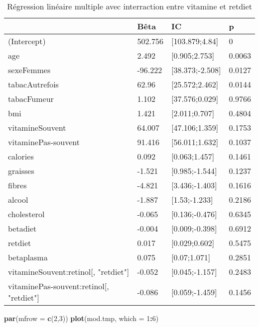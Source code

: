 \documentclass[]{article}
\newenvironment{Shaded}{\begin{snugshade}}{\end{snugshade}}
\newcommand{\KeywordTok}[1]{\textcolor[rgb]{0.13,0.29,0.53}{\textbf{#1}}}
\newcommand{\DataTypeTok}[1]{\textcolor[rgb]{0.13,0.29,0.53}{#1}}
\newcommand{\DecValTok}[1]{\textcolor[rgb]{0.00,0.00,0.81}{#1}}
\newcommand{\OperatorTok}[1]{\textcolor[rgb]{0.81,0.36,0.00}{\textbf{#1}}}
\newcommand{\NormalTok}[1]{#1}
\begin{document}
\begin{table}

\caption{\label{tab:unnamed-chunk-73}Régression linéaire multiple avec interraction entre vitamine et retdiet}
\centering
\begin{tabular}[t]{l|l|l|l}
\hline
  & Bêta & IC & p\\
\hline
\rowcolor[HTML]{BBD2E1}  (Intercept) & 502.756 & [103.879;4.84] & 0\\
\hline
age & 2.492 & [0.905;2.753] & 0.0063\\
\hline
\rowcolor[HTML]{BBD2E1}  sexeFemmes & -96.222 & [38.373;-2.508] & 0.0127\\
\hline
tabacAutrefois & 62.96 & [25.572;2.462] & 0.0144\\
\hline
\rowcolor[HTML]{BBD2E1}  tabacFumeur & 1.102 & [37.576;0.029] & 0.9766\\
\hline
bmi & 1.421 & [2.011;0.707] & 0.4804\\
\hline
\rowcolor[HTML]{BBD2E1}  vitamineSouvent & 64.007 & [47.106;1.359] & 0.1753\\
\hline
vitaminePas-souvent & 91.416 & [56.011;1.632] & 0.1037\\
\hline
\rowcolor[HTML]{BBD2E1}  calories & 0.092 & [0.063;1.457] & 0.1461\\
\hline
graisses & -1.521 & [0.985;-1.544] & 0.1237\\
\hline
\rowcolor[HTML]{BBD2E1}  fibres & -4.821 & [3.436;-1.403] & 0.1616\\
\hline
alcool & -1.887 & [1.53;-1.233] & 0.2186\\
\hline
\rowcolor[HTML]{BBD2E1}  cholesterol & -0.065 & [0.136;-0.476] & 0.6345\\
\hline
betadiet & -0.004 & [0.009;-0.398] & 0.6912\\
\hline
\rowcolor[HTML]{BBD2E1}  retdiet & 0.017 & [0.029;0.602] & 0.5475\\
\hline
betaplasma & 0.075 & [0.07;1.071] & 0.2851\\
\hline
\rowcolor[HTML]{BBD2E1}  vitamineSouvent:retinol[, "retdiet"] & -0.052 & [0.045;-1.157] & 0.2483\\
\hline
vitaminePas-souvent:retinol[, "retdiet"] & -0.086 & [0.059;-1.459] & 0.1456\\
\hline
\end{tabular}
\end{table}

\begin{Shaded}
\begin{Highlighting}[]
\KeywordTok{par}\NormalTok{(}\DataTypeTok{mfrow =} \KeywordTok{c}\NormalTok{(}\DecValTok{2}\NormalTok{,}\DecValTok{3}\NormalTok{))}
\KeywordTok{plot}\NormalTok{(mod.tmp, }\DataTypeTok{which =} \DecValTok{1}\OperatorTok{:}\DecValTok{6}\NormalTok{)}
\end{Highlighting}
\end{Shaded}
\end{document}
